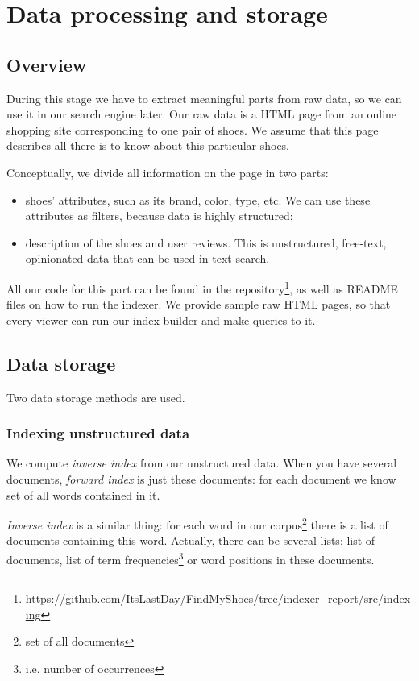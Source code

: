 \section{Data processing and storage}
\subsection{Overview} 
During this stage we have to extract meaningful parts from raw data, so we can use it in our search engine later. Our raw data is a HTML page from an online shopping site corresponding to one pair of shoes. We assume that this page describes all there is to know about this particular shoes.

Conceptually, we divide all information on the page in two parts:
\begin{itemize}
\item shoes' attributes, such as its brand, color, type, etc. 
We can use these attributes as filters, because data is highly structured;
\item description of the shoes and user reviews. 
This is unstructured, free-text, opinionated data that can be used in text search.
\end{itemize}

All our code for this part can be found in the repository\footnote{\url{https://github.com/ItsLastDay/FindMyShoes/tree/indexer_report/src/indexing}}, as well as README files on how to run the indexer. We provide sample raw HTML pages, so that every viewer can run our index builder and make queries to it.

\subsection{Data storage} \label{data_storage}
Two data storage methods are used.

\subsubsection{Indexing unstructured data} \label{indexing_arch}

We compute \textit{inverse index} from our unstructured data. 
When you have several documents, \textit{forward index} is just these documents: 
for each document we know set of all words contained in it.

\textit{Inverse index} is a similar thing: for each word in our corpus\footnote{set of all documents} 
there is a list of documents containing this word.
Actually, there can be several lists: list of documents, 
list of term frequencies\footnote{i.e. number of occurrences} or word positions in these documents.

